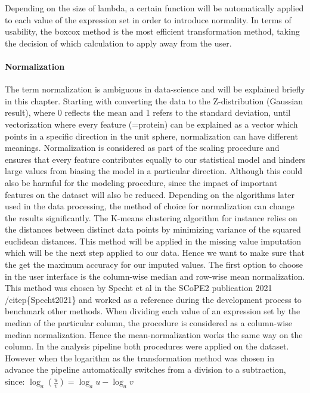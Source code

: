 \documentclass[
  11pt,
]{article}
\begin{document}
Depending on the size of lambda, a certain function will be
automatically applied to each value of the expression set in order to
introduce normality. In terms of usability, the boxcox method is the
most efficient transformation method, taking the decision of which
calculation to apply away from the user.

\hypertarget{normalization}{%
\paragraph{Normalization}\label{normalization}}

The term normalization is ambiguous in data-science and will be
explained briefly in this chapter. Starting with converting the data to
the Z-distribution (Gaussian result), where 0 reflects the mean and 1
refers to the standard deviation, until vectorization where every
feature (=protein) can be explained as a vector which points in a
specific direction in the unit sphere, normalization can have different
meanings. Normalization is considered as part of the scaling procedure
and ensures that every feature contributes equally to our statistical
model and hinders large values from biasing the model in a particular
direction. Although this could also be harmful for the modeling
procedure, since the impact of important features on the dataset will
also be reduced. Depending on the algorithms later used in the data
processing, the method of choice for normalization can change the
results significantly. The K-means clustering algorithm for instance
relies on the distances between distinct data points by minimizing
variance of the squared euclidean distances. This method will be applied
in the missing value imputation which will be the next step applied to
our data. Hence we want to make sure that the get the maximum accuracy
for our imputed values. The first option to choose in the user interface
is the column-wise median and row-wise mean normalization. This method
was chosen by Specht et al in the SCoPE2 publication 2021
/citep\{Specht2021\} and worked as a reference during the development
process to benchmark other methods. When dividing each value of an
expression set by the median of the particular column, the procedure is
considered as a column-wise median normalization. Hence the
mean-normalization works the same way on the column. In the analysis
pipeline both procedures were applied on the dataset. However when the
logarithm as the transformation method was chosen in advance the
pipeline automatically switches from a division to a subtraction, since:
\(\log_a \left(\frac{u}{v}\right)=\log_a u-\log_a v\)
\end{document}

